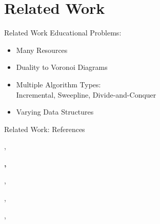 \documentclass[aspectratio=169,fleqn]{beamer}
\begin{document}
\section{Related Work}
  \begin{frame}{Related Work}
      Educational Problems:
      \begin{itemize}
        \pause
        \item Many Resources
        \pause
        \item Duality to Voronoi Diagrams
        \pause
        \item%
          Multiple Algorithm Types: \\
          Incremental, Sweepline, Divide-and-Conquer
        \pause
        \item Varying Data Structures
      \end{itemize}
  \end{frame}

  \begin{frame}{Related Work: References}
    \small
    \onslide<+->
    \begin{description}
      \item<+->[\citeyear{lee1980}] \citeauthor{lee1980}, 
      \item<+->[\citeyear{guibas1985}] \textbf<7>{\citeauthor{guibas1985}, }
      \item<+->[\citeyear{dwyer1987}] \citeauthor{dwyer1987}, 
      \item<+->[\citeyear{shewchuk1996}] \citeauthor{shewchuk1996}, 
      \item<+->[\citeyear{fuetterling2014}] \citeauthor{fuetterling2014}, 
    \end{description}
  \end{frame}
\end{document}
